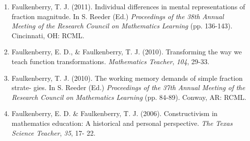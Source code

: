 \documentclass[article,10pt]{article}
\begin{document}
\begin{enumerate}
\item Faulkenberry, T. J. (2011). Individual differences in mental representations of fraction magnitude. In S. Reeder (Ed.) \emph{Proceedings of the 38th Annual Meeting of the Research Council on Mathematics Learning} (pp. 136-143). Cincinnati, OH: RCML.
\item Faulkenberry, E. D., \& Faulkenberry, T. J. (2010). Transforming the way we teach function transformations. \emph{Mathematics Teacher}, \emph{104}, 29-33.
\item Faulkenberry, T. J. (2010). The working memory demands of simple fraction strate- gies. In S. Reeder (Ed.) \emph{Proceedings of the 37th Annual Meeting of the Research Council on Mathematics Learning} (pp. 84-89). Conway, AR: RCML.
\item Faulkenberry, E. D. \& Faulkenberry, T. J. (2006). Constructivism in mathematics education: A historical and personal perspective. \emph{The Texas Science Teacher}, \emph{35}, 17- 22.
\end{enumerate}
\end{document}

